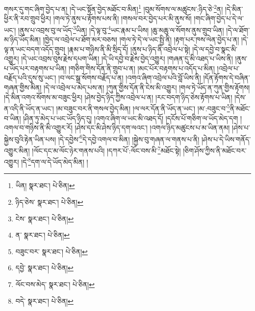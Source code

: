 གསར་དུ་གང་ཞིག་བྱེད་པ་ན། །དེ་ཡང་སྟོན་བྱེད་མཐོང་བ་མིན།\footnote{ཡིན།  སྣར་ཐང་།  པེ་ཅིན། } །བུམ་སོགས་ལ་མཚུངས་:ཉིད་ཅེ་\footnote{ཉིད་ཅེས་  སྣར་ཐང་།  པེ་ཅིན། }ན། །དེ་མིན་ཕྱིར་ནི་རབ་གྲུབ་ཕྱིར། །གལ་ཏེ་ནུས་པ་རྟོགས་པས་ནི། །གསལ་བར་བྱེད་པར་མི་ནུས་སོ། །གང་ཞིག་བྱེད་པ་དེ་ལ་ཡང་། །ནུས་པ་འབྲས་བུ་ལ་ཡོད་\footnote{ངེས་  སྣར་ཐང་།  པེ་ཅིན། }ཡིན། །དེ་ལྟ་བུ་\footnote{ན་  སྣར་ཐང་།  པེ་ཅིན། }ཡང་རྣམ་པ་ཡིས། །ཆུ་མཆུ་ལ་སོགས་ནུས་གྲུབ་ཡིན། །དེ་ལ་ཐོག་མ་ཉིད་ཡོད་མིན། །ཁྱེད་ལ་འབྲེལ་པ་ཐོག་མར་བཅས། །གལ་ཏེ་དེ་ལ་ཡང་སྤྱི་ནི། །རྟག་པར་ཁས་ལེན་བྱེད་པ་ན། །དེ་ལྟ་ན་ཡང་བདག་འདོད་གྲུབ། །རྣམ་པ་གཉིས་ནི་མི་སྲིད་དོ། །ནུས་པ་ཉིད་ནི་འབྲེལ་པ་སྟེ། །དེ་ལ་དབྱེ་བ་སྣང་མི་འགྱུར། །དེ་ཡང་འབྲས་བུས་རྗེས་དཔག་ཡིན། །དེ་ཡི་དབྱེ་བ་རྗེས་བྱེད་འགྱུར། །གཞན་དུ་མི་འཐད་པ་ཡིས་ནི། །ནུས་པ་ཡོད་པར་བརྟགས་པ་ཡིན། །གཅིག་གིས་དོན་ནི་གྲུབ་པ་ན། །མང་པོར་བརྟགས་པ་འདོད་པ་མིན། །འབྲེལ་པ་བརྗོད་པའི་དུས་སུ་ཡང་། །བ་ལང་སྒྲ་སོགས་བརྗོད་པ་ན། །འགའ་ཞིག་འབྲེལ་པའི་བློ་ཡིས་ནི། །དོན་རྟོགས་དེ་བཞིན་གཞན་གྱིས་མིན། །དེ་ལ་འབྲེལ་པ་མེད་པས་ན། །ཀུན་གྱིས་དོན་ནི་ངེས་མི་འགྱུར། །གལ་ཏེ་ཡོད་ན་ཀུན་གྱིས་རྟོགས། །དེ་མིན་འགའ་སོགས་མ་བཟུང་ཕྱིར། །ཤེས་བྱེད་ཉིད་ཀྱིས་འབྲེལ་པ་ན། །རང་བདག་ཉིད་ཅེས་རྟོགས་པ་ཡིན། །དེས་ན་འདི་ནི་ཡོད་ན་ཡང་། །མ་བཟུང་བར་ནི་གསལ་བྱེད་མིན། །ལ་ལར་དོན་ནི་ཡོད་ན་ཡང་། །མ་:བཟུང་བ་\footnote{བཟུང་བར་  སྣར་ཐང་།  པེ་ཅིན། }ནི་མཐོང་བ་ཡིན། །ཤིན་ཏུ་མེད་པ་ཡང་ཡོད་ཉིད་དུ། །འགའ་ཞིག་ལ་ཡང་མི་འཐད་དོ། །དངོས་པོ་གཅིག་ལ་ཡོད་མེད་དག །འགལ་བ་གཉིས་ནི་མི་འགྱུར་རོ། །ཤེས་དང་མི་ཤེས་ཉིད་དག་ལའང་། །འགལ་ཉིད་མཚུངས་པ་མ་ཡིན་ནམ། །ཤེས་པ་སྐྱེས་བུའི་རྟེན་ཡིན་པས། །དེ་དབྱེས་\footnote{དབྱེ་  སྣར་ཐང་།  པེ་ཅིན། }དེ་དབྱེ་འགལ་བ་མིན། །སྐྱེས་བུ་གཞན་ལ་གནས་པ་ནི། །ཤེས་པ་དེ་ཡིས་གནོད་འགྱུར་མིན། །ལོང་དང་མ་ལོང་ཉེར་གནས་པའི། །དཀར་པོ་:ལོང་བས་མི་\footnote{ལོང་བས་མེད་  སྣར་ཐང་།  པེ་ཅིན། }མཐོང་སྟེ། །ཅིག་ཤོས་ཀྱིས་ནི་མཐོང་བར་འགྱུར། །དེ་\footnote{བདེ་  སྣར་ཐང་།  པེ་ཅིན། }དག་ལ་དེ་ཡོད་མེད་མིན། །
